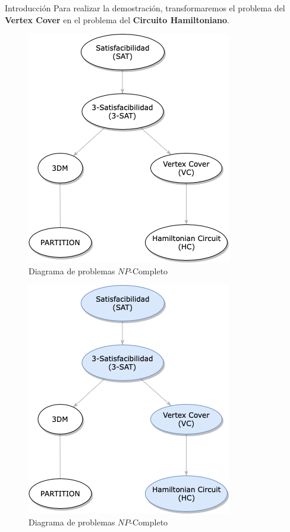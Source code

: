 \documentclass{beamer}
\begin{document}
\begin{frame}{Introducción}
    Para realizar la demostración, transformaremos el problema del \textbf{Vertex Cover} en el problema del \textbf{Circuito Hamiltoniano}.
     {
        \begin{figure}
            \centering
            \includegraphics[scale=0.4]{images/NP-Completo-1.png}
            \caption{Diagrama de problemas $NP$-Completo}
            \label{fig:my_label}
        \end{figure}
    }
    
     {
        \begin{figure}
            \centering
            \includegraphics[scale=0.4]{images/NP-Completo-2.png}
            \caption{Diagrama de problemas $NP$-Completo}
            \label{fig:my_label}
        \end{figure}
    }
\end{frame}
\end{document}
